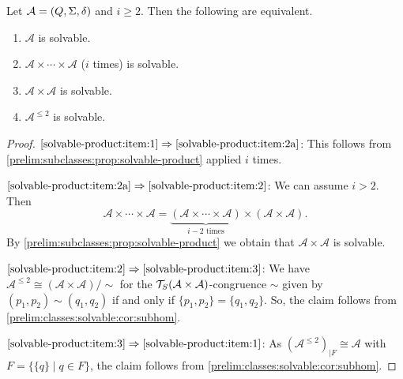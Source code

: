 \begin{corollary}\label{prelim:subclasses:cor:solvable-product}
	Let $\mathcal A = (Q, \Sigma, \delta)$ and $i \ge 2$.
	Then the following are equivalent.
	
	\begin{enumerate}
		\item \label{solvable-product:item:1} $\mathcal A$ is solvable.
		
		\item \label{solvable-product:item:2a}
		$\mathcal A \times \cdots \times \mathcal A$ ($i$ times) is solvable.
		
		\item \label{solvable-product:item:2} $\mathcal A \times \mathcal A$ is solvable.
		
		\item \label{solvable-product:item:3} $\mathcal A^{\le 2}$ is solvable. %
	\end{enumerate}	
\end{corollary}
\begin{proof}
	$\ref{solvable-product:item:1} \Rightarrow \ref{solvable-product:item:2a}$: This follows from \cref{prelim:subclasses:prop:solvable-product}
	applied $i$ times.
	
	$\ref{solvable-product:item:2a} \Rightarrow \ref{solvable-product:item:2}$:
	We can assume $i > 2$.
	Then 
	\[
	\mathcal A \times \cdots \times \mathcal A = \underbrace{(\mathcal A \times \cdots \times \mathcal A)}_{\text{$i-2$ times}} \times (\mathcal A \times \mathcal A).
	\]
	By \cref{prelim:subclasses:prop:solvable-product} 
	we obtain that $\mathcal A \times \mathcal A$
	is solvable.
			
	$\ref{solvable-product:item:2} \Rightarrow \ref{solvable-product:item:3}$: We have $\mathcal A^{\le 2} \cong (\mathcal A \times \mathcal A) / \sim$
	for the $\mathcal T_S(\mathcal A \times \mathcal A)$-congruence $\sim$
	given by $(p_1,p_2) \sim (q_1, q_2)$
	if and only if $\{p_1, p_2\} = \{q_1, q_2\}$.
	So, the claim follows from \cref{prelim:classes:solvable:cor:subhom}. 
		
	$\ref{solvable-product:item:3} \Rightarrow \ref{solvable-product:item:1}$: %
	As $(\mathcal A^{\le 2})_{|F} \cong \mathcal A$
	with $F = \{ \{q\} \mid q \in F\}$, the claim follows from \cref{prelim:classes:solvable:cor:subhom}.
\end{proof} 

